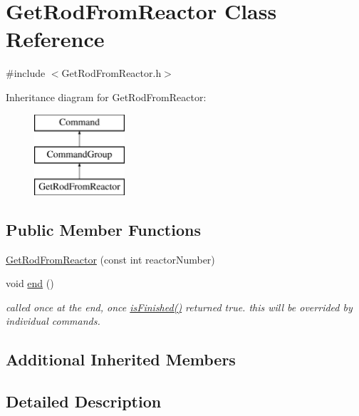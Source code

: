 \hypertarget{classGetRodFromReactor}{\section{Get\-Rod\-From\-Reactor Class Reference}
\label{classGetRodFromReactor}
}


{\ttfamily \#include $<$Get\-Rod\-From\-Reactor.\-h$>$}

Inheritance diagram for Get\-Rod\-From\-Reactor\-:\begin{figure}[H]
\begin{center}
\leavevmode
\includegraphics[height=3.000000cm]{classGetRodFromReactor}
\end{center}
\end{figure}
\subsection*{Public Member Functions}
\begin{DoxyCompactItemize}
\item 
\hyperlink{classGetRodFromReactor_ae6432d3e1fd6ca0e882d9cbff1b14737}{Get\-Rod\-From\-Reactor} (const int reactor\-Number)
\item 
void \hyperlink{classGetRodFromReactor_a8d375cbbf822ea0f22058a264347bd37}{end} ()
\begin{DoxyCompactList}\small\item\em called once at the end, once \hyperlink{classCommandGroup_a96807a2763adf9e21ebf2cb9e3574e3c}{is\-Finished()} returned true. this will be overrided by individual commands. \end{DoxyCompactList}\end{DoxyCompactItemize}
\subsection*{Additional Inherited Members}


\subsection{Detailed Description}


